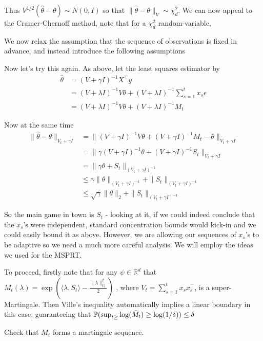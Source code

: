 Thus $V^{1/2}(\hat{\theta} - \theta) \sim N(0, I)$ so that $\|\hat{\theta} - \theta\|_{V} \sim \chi^2_d$. We can now appeal to the Cramer-Chernoff method, note that for a $\chi^2_d$ random-variable, 

We now relax the assumption that the sequence of observations is fixed in advance, and instead introduce the following assumptions


Now let's try this again. As above, let the least squares estimator by 
\begin{align*}
\hat{\theta} 
&= (V + \gamma I)^{-1} X^{\top}y  \\
&= (V + \lambda I)^{-1} V\theta +  (V + \lambda I)^{-1} \sum_{s=1}^t x_s\epsilon\\
&= (V + \lambda I)^{-1} V\theta +  (V + \lambda I)^{-1}M_t
\end{align*}

Now at the same time
\begin{align*}
\|\hat{\theta} - \theta\|_{V_t + \gamma I}
&= \|(V + \gamma I)^{-1} V\theta +  (V + \gamma I)^{-1}M_t - \theta\|_{V_t + \gamma I}\\
&= \|\gamma (V + \gamma I)^{-1} \theta +  (V + \gamma I)^{-1}S_t \|_{V_t + \gamma I}\\
&= \|\gamma \theta +  S_t \|_{(V_t + \gamma I)^{-1}}\\
&\leq \gamma\|\theta\|_{(V_t + \gamma I)^{-1}} + \|S_t\|_{(V_t + \gamma I)^{-1}}\\
&\leq \sqrt{\gamma}\|\theta\|_{2} + \|S_t\|_{(V_t + \gamma I)^{-1}}
\end{align*}

So the main game in town is $S_t$ - looking at it, if we could indeed conclude that the $x_s$'s were independent, standard concentration bounds would kick-in and we could easily bound it as above. However, we are allowing our sequences of $x_s$'s to be adaptive so we need a much more careful analysis. We will employ the ideas we used for the MSPRT.

To proceed, firstly note that for any $\psi\in \mathbb{R}^d$ that $M_t(\lambda) = \exp\left( \langle \lambda, S_t\rangle - \frac{\|\lambda\|_{V_t}^2}{2} \right)$ , 
where $V_t = \sum_{s=1}^t x_s x_s^{\top}$, is a super-Martingale. Then Ville's inequality automatically implies a linear boundary in this case, guaranteeing that $\P(\sup_{t\geq }\log(\bar{M}_t) \geq \log(1/\delta)) \leq \delta$

\exercise Check that $M_t$ forms a martingale sequence. 

